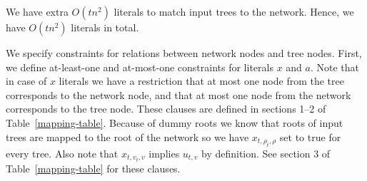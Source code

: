 \documentclass[runningheads, envcountsame, a4paper]{llncs}
\begin{document}
We have extra $O(tn^2)$ literals to match input trees to the network. Hence, we have $O(tn^2)$ literals in total.

We specify constraints for relations between network nodes and tree nodes. 
First, we define at-least-one and at-most-one constraints for literals $x$ and $a$. Note that in case 
of $x$ literals we have a restriction that at most one node from the tree corresponds to the network node, and that at 
most one node from the network corresponds to the tree node. These clauses are defined in sections 1--2 of Table~\ref{mapping-table}.
Because of dummy roots we know that roots of input trees 
are mapped to the root of the network so we have $x_{t,\rho_t,\rho}$ set to true for every tree. Also 
note that $x_{t,v_t,v}$ implies $u_{t,v}$ by definition. See section 3 of Table~\ref{mapping-table} for these clauses.
\end{document}
